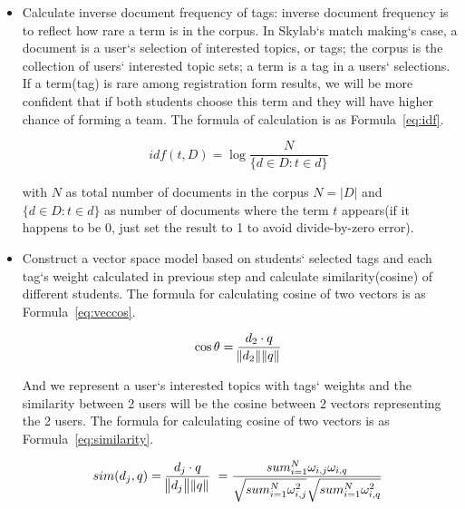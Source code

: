 \begin{itemize}
  \item Calculate inverse document frequency of tags: inverse document frequency is to reflect how rare a term is in the corpus\cite{citationir}. In Skylab`s match making`s case, a document is a user`s selection of interested topics, or tags; the corpus is the collection of users` interested topic sets; a term is a tag in a users` selections. If a term(tag) is rare among registration form results, we will be more confident that if both students choose this term and they will have higher chance of forming a team. The formula of calculation is as Formula~\ref{eq:idf}.

  \begin{equation}
    idf(t,D) = \log \frac{N}{\{ d \in D : t \in d \}} \
    \label{eq:idf}
  \end{equation}
  
  with \(N\) as total number of documents in the corpus \( N = |D| \) and \(\{ d \in D : t \in d \}\) as number of documents where the term \(t\) appears\cite{citationir}(if it happens to be 0, just set the result to 1 to avoid divide-by-zero error).

  \item Construct a vector space model based on students` selected tags and each tag`s weight calculated in previous step and calculate similarity(cosine) of different students. The formula for calculating cosine of two vectors is as Formula~\ref{eq:veccos}\cite{citationvecspacemodel}.

  \begin{equation}
    \cos\theta  = \frac{d_2 \cdot q}{ \norm{d_2} \norm{q} } \
    \label{eq:veccos}
  \end{equation}

  And we represent a user`s interested topics with tags` weights and the similarity between 2 users will be the cosine between 2 vectors representing the 2 users. The formula for calculating cosine of two vectors is as Formula~\ref{eq:similarity}\cite{citationvecspacemodel}.

  \begin{equation}
    sim(d_j, q)  = \frac{d_j \cdot q}{ \norm{d_j} \norm{q} } \ = \frac{sum_{i=1}^{N} \omega_{i,j} \omega_{i,q}}{ \sqrt{sum_{i=1}^{N} \omega_{i,j}^2} \sqrt{sum_{i=1}^{N} \omega_{i,q}^2}} \
    \label{eq:similarity}
  \end{equation}

\end{itemize}

